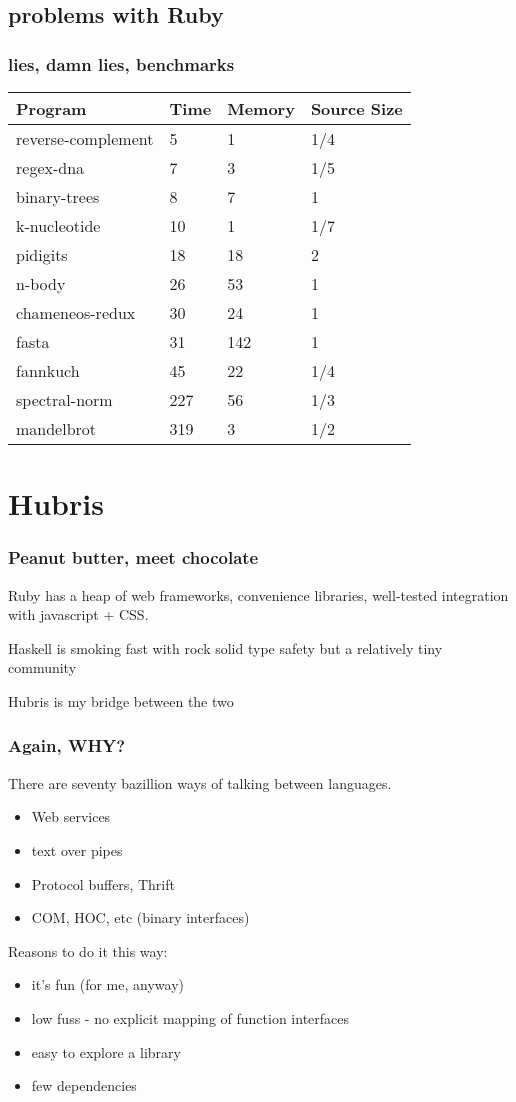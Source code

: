 \documentclass{beamer}
\begin{document}
\subsection{problems with Ruby}
\begin{frame}
  \frametitle{lies, damn lies, benchmarks}
  \begin{tabular}{l l l l} 
    Program &	        Time	&Memory &	Source Size\\ \hline
    reverse-complement	&5	&1	&1/4\\
    regex-dna	        &7	&3	&1/5\\	
    binary-trees	        &8	&7	&1	\\	
    k-nucleotide	        &10	&1	&1/7	\\	
    pidigits	        &18	&18	&2	\\	
    n-body	        &26	&53	&1	\\	
    chameneos-redux	&30	&24	&1	\\	
    fasta	                &31	&142	&1	\\	
    fannkuch	        &45	&22	&1/4	\\	
    spectral-norm	        &227	&56	&1/3	\\	
    mandelbrot	        &319	&3	&1/2\\	
  \end{tabular}
\end{frame}



\section{Hubris}
\begin{frame}
\frametitle{Peanut butter, meet chocolate}
Ruby has a heap of web frameworks, convenience libraries, well-tested
integration with javascript + CSS.

\setlength\parskip{0.25in}

Haskell is smoking fast with rock solid type safety but a relatively tiny
community

Hubris is my bridge between the two
\end{frame}

\begin{frame}
\frametitle{Again, WHY?}
There are seventy bazillion ways of talking between languages.
 \begin{itemize}
  \item Web services
  \item text over pipes
  \item Protocol buffers, Thrift
  \item COM, HOC, etc (binary interfaces)
 \end{itemize}

Reasons to do it this way:
 \begin{itemize}
   \item it's fun (for me, anyway)
   \item low fuss - no explicit mapping of function interfaces
   \item easy to explore a library
   \item few dependencies
 \end{itemize}
\end{frame}
\end{document}

